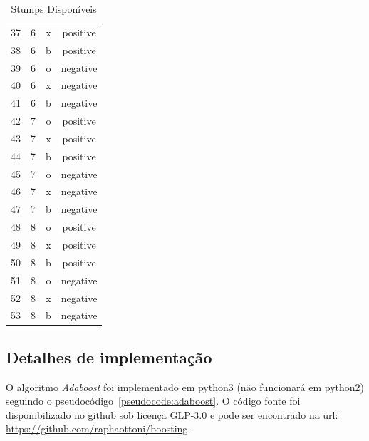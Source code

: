 \begin{table}[h]
\begin{tabular}{lccc}
37 & 6 & x & positive \\
38 & 6 & b & positive \\
39 & 6 & o & negative \\
40 & 6 & x & negative \\
41 & 6 & b & negative \\
42 & 7 & o & positive \\
43 & 7 & x & positive \\
44 & 7 & b & positive \\
45 & 7 & o & negative \\
46 & 7 & x & negative \\
47 & 7 & b & negative \\
48 & 8 & o & positive \\
49 & 8 & x & positive \\
50 & 8 & b & positive \\
51 & 8 & o & negative \\
52 & 8 & x & negative \\
53 & 8 & b & negative \\
\end{tabular}
\caption{Stumps Disponíveis}
\label{tab:stumps}
\end{table}


\subsection{Detalhes de implementação}
O algoritmo \emph{Adaboost} foi implementado em python3 (não funcionará em python2) seguindo o pseudocódigo~\ref{pseudocode:adaboost}. O código fonte foi disponibilizado no github sob licença  GLP-3.0 e pode ser encontrado na url: \url{https://github.com/raphaottoni/boosting}.

